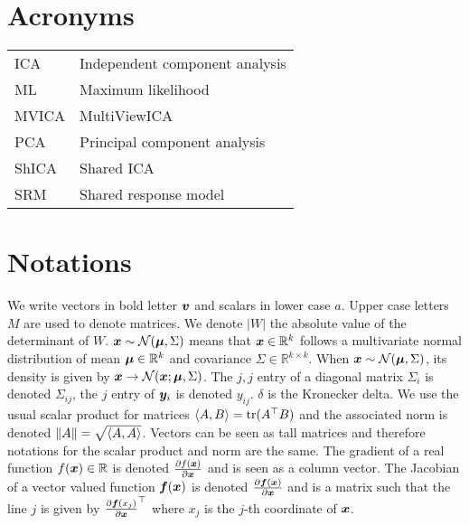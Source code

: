     \chapter*{Acronyms}
    \begin{tabular}{ll}
        ICA & Independent component analysis \\
        ML & Maximum likelihood \\
      MVICA & MultiViewICA \\
      PCA & Principal component analysis \\
      ShICA & Shared ICA \\
      SRM & Shared response model \\

    \end{tabular}

    \chapter*{Notations}
    We write vectors in bold letter $\boldsymbol{v}$ and scalars in lower case $a$. Upper case letters $M$ are used to denote
    matrices. We denote $|W|$ the absolute value of the determinant of $W$. $\boldsymbol{x} \sim \mathcal{N}(\boldsymbol{\mu}, \Sigma)$ means that $\boldsymbol{x} \in \mathbb{R}^k$ follows a multivariate normal distribution of mean $\boldsymbol{\mu} \in \mathbb{R}^k$ and
    covariance $\Sigma \in \mathbb{R}^{k \times k}$. When $\boldsymbol{x} \sim \mathcal{N}(\boldsymbol{\mu},
    \Sigma)$, its density is given by $\boldsymbol{x} \rightarrow \mathcal{N}(\boldsymbol{x}; \boldsymbol{\mu}, \Sigma)$. The $j, j$ entry of a diagonal matrix $\Sigma_i$ is denoted $\Sigma_{ij}$, the $j$ entry of $\boldsymbol{y}_i$ is denoted $y_{ij}$. $\delta$ is the Kronecker delta.
    We use the usual scalar product for matrices $\langle{ A },{ B}\rangle =
    \mathop{\mathrm{tr}}(A^{\top} B)$ and the associated norm is denoted $\|A\| = \sqrt{\langle{ A},{ A }\rangle}$. Vectors can be seen as tall matrices and therefore notations for
    the scalar product and norm are the same.
    The gradient of a real function $f(\boldsymbol{x}) \in \mathbb{R}$ is denoted $\frac{ \partial f(\boldsymbol{x})}{\partial \boldsymbol{x}}$
    and is seen as a column vector. The Jacobian of a vector valued
    function $\boldsymbol{f}(\boldsymbol{x})$ is denoted $\frac{ \partial \boldsymbol{f}(\boldsymbol{x})}{\partial \boldsymbol{x}}$ and is a matrix
    such that the line $j$ is given by $\frac{ \partial \boldsymbol{f}(x_j)}{\partial \boldsymbol{x}}^{\top}$ where $x_j$
    is the $j$-th coordinate of $\boldsymbol{x}$.
\endgroup
